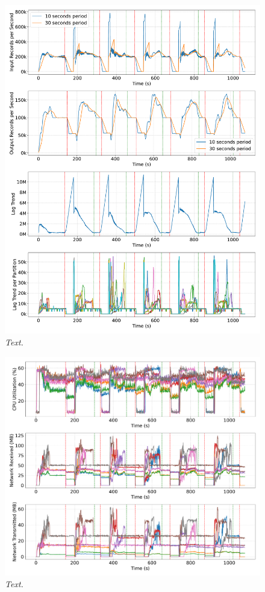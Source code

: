 \begin{figure}[ht]
    \centering
    \includegraphics[width=1\textwidth]{figures/kstreams-2pods/kafka_2_pods_plot_impact}
    \caption{\textit{Text.}}
    \label{fig:kafka-2pods-impact}
\end{figure}


\begin{figure}[ht]
    \centering
    \includegraphics[width=1\textwidth]{figures/kstreams-2pods/kafka_2_pods_resources}
    \caption{\textit{Text.}}
    \label{fig:kafka-2pods-resource}
\end{figure}


